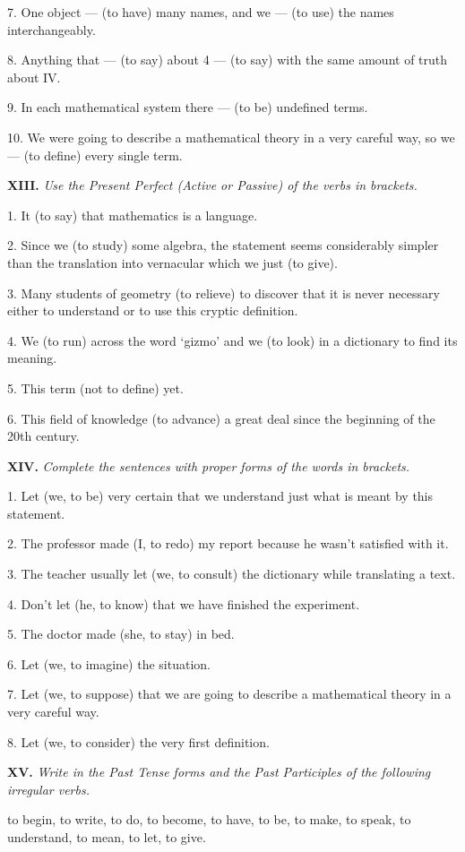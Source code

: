 \documentclass[a4paper]{article}
\newcommand{\ETask}[2]{\medskip\par\textbf{#1.} \textit{#2}\par}
\begin{document}
7. One object --- (to have) many names, and we --- (to use) the names interchangeably.

8. Anything that --- (to say) about 4 --- (to say) with the same amount of truth about IV.

9. In each mathematical system there --- (to be) undefined terms.

10. We were going to describe a mathematical theory in a very careful way, so we --- (to define) every single term.

\ETask{XIII}{Use the Present Perfect (Active or Passive) of the verbs in brackets.}
1. It (to say) that mathematics is a language.

2. Since we (to study) some algebra, the statement seems considerably simpler than the translation into
vernacular which we just (to give).

3. Many students of geometry (to relieve) to discover that it is never necessary either to understand or to
use this cryptic definition.

4. We (to run) across the word `gizmo' and we (to look) in a dictionary to find its meaning.

5. This term (not to define) yet.

6. This field of knowledge (to advance) a great deal since the beginning of the 20th century.

\ETask{XIV}{Complete the sentences with proper forms of the words in brackets.}

1. Let (we, to be) very certain that we understand just what is meant by this statement.

2. The professor made (I, to redo) my report because he wasn't satisfied with it.

3. The teacher usually let (we, to consult) the dictionary while translating a text.

4. Don't let (he, to know) that we have finished the experiment.

5. The doctor made (she, to stay) in bed.

6. Let (we, to imagine) the situation.

7. Let (we, to suppose) that we are going to describe a mathematical theory in a very careful way.

8. Let (we, to consider) the very first definition.

\ETask{XV}{Write in the Past Tense forms and the Past Participles of the following irregular verbs.}
to begin, to write, to do, to become, to have, to be, to make, to speak, to understand, to mean, to let, to give.
\end{document}

